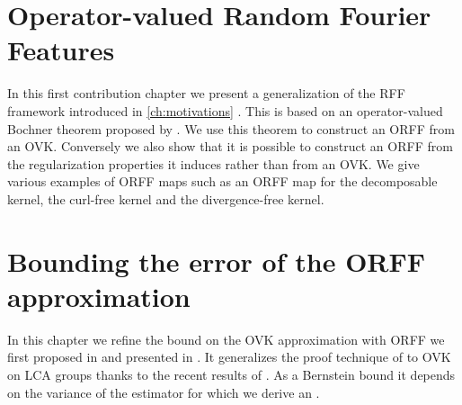 
\chapter{Operator-valued Random Fourier Features}
\label{ch:operator-valued_random_fourier_features}
\bigskip
\begin{justify}
    In this first contribution chapter we present a generalization of the
    \acs{RFF} framework introduced in \cref{ch:motivations}
    \citep{brault2016random}. This is based on an operator-valued Bochner
    theorem proposed by \citet{Carmeli2010}. We use this theorem to construct an
    \acf{ORFF} from an \acs{OVK}. Conversely we also show that it is possible
    to construct an \acs{ORFF} from the regularization properties it induces
    rather than from an \acs{OVK}. We give various examples of \acs{ORFF} maps
    such as an \acs{ORFF} map for the decomposable kernel, the curl-free kernel
    and the divergence-free kernel.
\end{justify}
\minitoc


\chapter{Bounding the error of the ORFF approximation} %
\label{ch:concistency_and_generalization}
\bigskip
\begin{justify}
    In this chapter we refine the bound on the \ac{OVK} approximation with
    \ac{ORFF} we first proposed in \cite{brault2016random} and presented in
    \cite{braultborne}. It generalizes the proof technique of
    \citet{Rahimi2007} to \ac{OVK} on \ac{LCA} groups thanks to the recent
    results of \citet{sutherland2015, tropp2015introduction, minsker2011some,
    koltchinskii2013remark}. As a Bernstein bound it depends on the variance of
    the estimator for which we derive an .
\end{justify}
\minitoc


